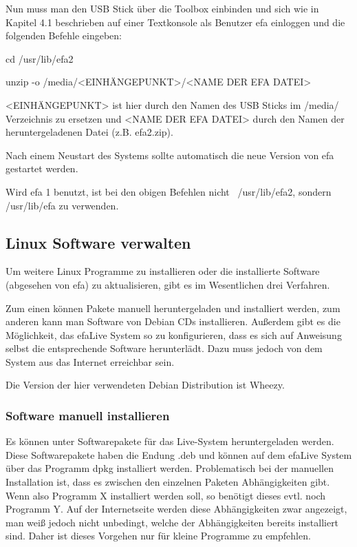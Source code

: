 \documentclass[a4paper,12pt,twoside]{article}
\begin{document}
Nun muss man den USB Stick über die Toolbox einbinden und sich wie in
Kapitel 4.1 beschrieben auf einer Textkonsole als Benutzer
{\textquotedbl}efa{\textquotedbl} einloggen und die folgenden Befehle
eingeben:


\bigskip

cd /usr/lib/efa2

unzip -o /media/{\textless}EINHÄNGEPUNKT{\textgreater}/{\textless}NAME
DER EFA DATEI{\textgreater}


\bigskip

{\textless}EINHÄNGEPUNKT{\textgreater} ist hier durch den Namen des USB
Sticks im /media/ Verzeichnis zu ersetzen und {\textless}NAME DER EFA
DATEI{\textgreater} durch den Namen der heruntergeladenen Datei (z.B.
efa2.zip).

Nach einem Neustart des Systems sollte automatisch die neue Version von
efa gestartet werden.


\bigskip

Wird efa 1 benutzt, ist bei den obigen Befehlen nicht \ /usr/lib/efa2,
sondern /usr/lib/efa zu verwenden.


\bigskip

\subsection{Linux Software verwalten}
Um weitere Linux Programme zu installieren oder die installierte
Software (abgesehen von efa) zu aktualisieren, gibt es im Wesentlichen
drei Verfahren. 

Zum einen können Pakete manuell heruntergeladen und installiert werden,
zum anderen kann man Software von Debian CDs installieren. Außerdem
gibt es die Möglichkeit, das efaLive System so zu konfigurieren, dass
es sich auf Anweisung selbst die entsprechende Software herunterlädt.
Dazu muss jedoch von dem System aus das Internet erreichbar sein.

Die Version der hier verwendeten Debian Distribution ist
{\textquotedbl}Wheezy{\textquotedbl}.


\bigskip

\subsubsection{Software manuell installieren}
Es können unter \cite{DEB3} Softwarepakete für das Live-System
heruntergeladen werden. Diese Softwarepakete haben die Endung
{\textquotedbl}.deb{\textquotedbl} und können auf dem efaLive System
über das Programm dpkg installiert werden. Problematisch bei der
manuellen Installation ist, dass es zwischen den einzelnen Paketen
Abhängigkeiten gibt. Wenn also Programm X installiert werden soll, so
benötigt dieses evtl. noch Programm Y. Auf der Internetseite werden
diese Abhängigkeiten zwar angezeigt, man weiß jedoch nicht unbedingt,
welche der Abhängigkeiten bereits installiert sind. Daher ist dieses
Vorgehen nur für kleine Programme zu empfehlen.
\end{document}
